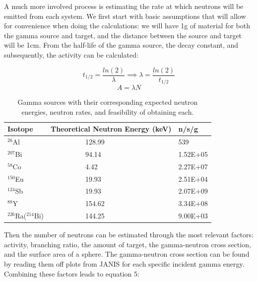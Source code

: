 \documentclass[%
12pt,
twoside,
reprint,
amsmath,amssymb,
aps,
]{article}
\begin{document}
	\par A much more involved process is estimating the rate at which neutrons will be emitted from each system. We first start with basic assumptions that will allow for convenience when doing the calculations: we will have 1g of material for both the gamma source and target, and the distance between the source and target will be 1cm. From the half-life of the gamma source, the decay constant, and subsequently, the activity can be calculated:
	
	\begin{equation*}
	t_{1/2} = \frac{ln(2)}{\lambda} \implies \lambda = \frac{ln(2)}{t_{1/2}}
	\end{equation*}
	\begin{equation*}
	A = \lambda N
	\end{equation*}
	
	\begin{table}
		\begin{center}
			\scriptsize
			\begin{tabular}{p{3.1cm} p{3.1cm} p{3.1cm}}
				\hline
				\textbf{Isotope} & \textbf{Theoretical Neutron Energy (keV)} & \textbf{n/s/g} \\ \hline
				$^{26}$Al &\ \ \ \ \ \ \ \ \ \ 128.99 & 539 \\ \hline
				$^{207}$Bi &\ \ \ \ \ \ \ \ \ \ 94.14 & 1.52E+05 \\ \hline
				$^{58}$Co &\ \ \ \ \ \ \ \ \ \ 4.42 & 2.27E+07 \\ \hline
				$^{150}$Eu &\ \ \ \ \ \ \ \ \ \ 19.93 & 2.51E+04 \\ \hline
				$^{124}$Sb &\ \ \ \ \ \ \ \ \ \ 19.93 & 2.07E+09 \\ \hline
				$^{88}$Y &\ \ \ \ \ \ \ \ \ \ 154.62 & 3.34E+08 \\ \hline
				$^{226}$Ra($^{214}$Bi) &\ \ \ \ \ \ \ \ \ \ 144.25 & 9.00E+03 \\ \hline
			\end{tabular}
			\caption{Gamma sources with their corresponding expected neutron energies, neutron rates, and feasibility of obtaining each.}
		\end{center}
	\end{table}
	
	\noindent Then the number of neutrons can be estimated through the most relevant factors: activity, branching ratio, the amount of target, the gamma-neutron cross section, and the surface area of a sphere. The gamma-neutron cross section can be found by reading them off plots from JANIS for each specific incident gamma energy. Combining these factors leads to equation 5:
	
\end{document}
